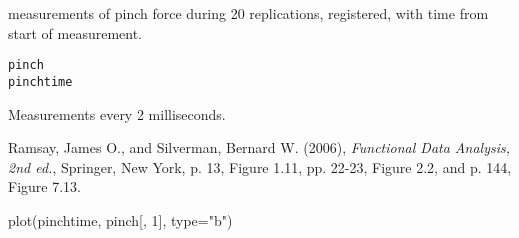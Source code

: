 \documentclass{article}
\begin{document}
\begin{Description} measurements of pinch force during 20 replications, registered, with
time from start of measurement.
\end{Description}
\begin{Usage}
\begin{verbatim}
pinch
pinchtime
\end{verbatim}
\end{Usage}
\begin{Format}\relax
{}
\end{Format}
\begin{Details}\relax
Measurements every 2 milliseconds.
\end{Details}
\begin{Source}\relax
Ramsay, James O., and Silverman, Bernard W. (2006), \emph{Functional
Data Analysis, 2nd ed.}, Springer, New York, p. 13, Figure 1.11,
pp. 22-23, Figure 2.2, and p. 144, Figure 7.13.
\end{Source}
\begin{Examples}
\begin{ExampleCode}
  plot(pinchtime, pinch[, 1], type="b")
\end{ExampleCode}
\end{Examples}
\end{document}
